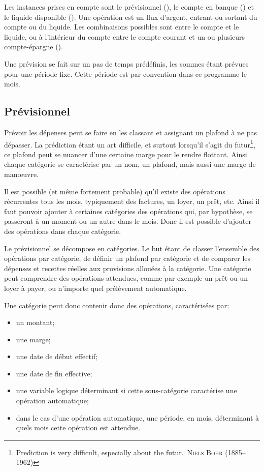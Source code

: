 Les instances prises en compte sont le prévisionnel
(\forecast), le compte en banque (\bank) et le 
liquide disponible (\liquid). Une opération est un flux d'argent, 
entrant ou sortant du compte ou du liquide. Les combinaisons possibles 
sont entre le compte et le liquide, ou à l'intérieur du compte entre le 
compte courant et un ou plusieurs compte-épargne (\saving).

Une prévision se fait sur un pas de temps prédéfinis, les sommes
étant prévues pour une période fixe. Cette période est par convention
dans ce programme le mois.

\subsection{Prévisionnel}

Prévoir les dépenses peut se faire en les classant et assignant
un plafond à ne pas dépasser. La prédiction étant un art difficile,
et surtout lorsqu'il s'agit du futur\footnote{\og Prediction is very
difficult, especially about the futur.\fg\ \textsc{Niels Bohr}
(1885--1962)}, ce plafond peut se nuancer d'une certaine marge
pour le rendre flottant.
Ainsi chaque catégorie se caractérise par un nom, un plafond, mais
aussi une marge de man\oe uvre.

Il est possible (et même fortement probable) qu'il existe des
opérations récurrentes tous les mois, typiquement des factures, 
un loyer, un prêt, etc. Ainsi il faut pouvoir ajouter
à certaines catégories des opérations qui, par hypothèse,
se passeront à un moment ou un autre dans le mois.
Donc il est possible d'ajouter des opérations dans chaque
catégorie.

Le prévisionnel se décompose en catégories. Le but étant de classer 
l'ensemble des opérations par catégorie, de définir un plafond par 
catégorie et de comparer les dépenses et recettes réelles aux 
provisions allouées à la catégorie. Une catégorie peut comprendre 
des opérations attendues, comme par exemple un prêt ou un loyer à 
payer, ou n'importe quel prélèvement automatique.

Une catégorie peut donc contenir donc des opérations, caractérisées
par:
\begin{itemize}
\item un montant;
\item une marge;
\item une date de début effectif;
\item une date de fin effective;
\item une variable logique déterminant si cette sous-catégorie
        caractérise une opération automatique;
\item dans le cas d'une opération automatique, une période, en mois,
        déterminant à quels mois cette opération est attendue.
\end{itemize}

